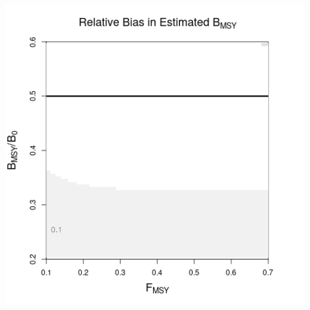 \documentclass[ xcolor = pdftex, dvipsnames, table ]{beamer}
\begin{document}
\begin{frame}
{\begin{minipage}[h!]{0.325\textwidth}
\hspace*{0.25cm}
\includegraphics[width=1.1\textwidth]{../../.././nick/gpBias/bMSYRelBiasPellaExpT90.png}
\end{minipage}
}
\end{frame}


%
\end{document}
